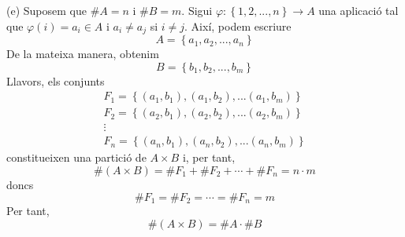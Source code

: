 \begin{solucio}
(e) Suposem que $\#A=n$ i $\#B=m$. Sigui $\varphi :\left\{ 1,2,...,n\right\}
\longrightarrow A$ una aplicació tal que $\varphi (i)=a_{i}\in A$ i $%
a_{i}\neq a_{j}$ si $i\neq j$. Així, podem escriure%
\begin{equation*}
A=\left\{ a_{1},a_{2},...,a_{n}\right\}
\end{equation*}%
De la mateixa manera, obtenim%
\begin{equation*}
B=\left\{ b_{1},b_{2},...,b_{m}\right\}
\end{equation*}%
Llavors, els conjunts%
\begin{equation*}
\begin{array}{c}
F_{1}=\left\{ (a_{1},b_{1}),(a_{1},b_{2}),...(a_{1},b_{m})\right\} \\
F_{2}=\left\{ (a_{2},b_{1}),(a_{2},b_{2}),...(a_{2},b_{m})\right\} \\
\vdots \\
F_{n}=\left\{ (a_{n},b_{1}),(a_{n},b_{2}),...(a_{n},b_{m})\right\}%
\end{array}%
\end{equation*}%
constitueixen una partició de $A\times B$ i, per tant,%
\begin{equation*}
\#\left( A\times B\right) =\#F_{1}+\#F_{2}+\cdots +\#F_{n}=n\cdot m
\end{equation*}%
doncs%
\begin{equation*}
\#F_{1}=\#F_{2}=\cdots =\#F_{n}=m
\end{equation*}%
Per tant,%
\begin{equation*}
\#\left( A\times B\right) =\#A\cdot \#B
\end{equation*}


\end{solucio}

